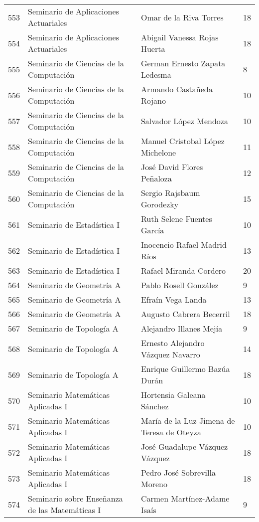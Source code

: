 \begin{table}[ht]
\begin{tabular}{rlll}
  553 & Seminario de Aplicaciones Actuariales & Omar de la Riva Torres & 18 \\ 
  554 & Seminario de Aplicaciones Actuariales & Abigail Vanessa Rojas Huerta & 18 \\ 
  555 & Seminario de Ciencias de la Computación & German Ernesto Zapata Ledesma & 8 \\ 
  556 & Seminario de Ciencias de la Computación & Armando Castañeda Rojano & 10 \\ 
  557 & Seminario de Ciencias de la Computación & Salvador López Mendoza & 10 \\ 
  558 & Seminario de Ciencias de la Computación & Manuel Cristobal López Michelone & 11 \\ 
  559 & Seminario de Ciencias de la Computación & José David Flores Peñaloza & 12 \\ 
  560 & Seminario de Ciencias de la Computación & Sergio Rajsbaum Gorodezky & 15 \\ 
  561 & Seminario de Estadística I & Ruth Selene Fuentes García & 10 \\ 
  562 & Seminario de Estadística I & Inocencio Rafael Madrid Ríos & 13 \\ 
  563 & Seminario de Estadística I & Rafael Miranda Cordero & 20 \\ 
  564 & Seminario de Geometría A & Pablo Rosell González & 9 \\ 
  565 & Seminario de Geometría A & Efraín Vega Landa & 13 \\ 
  566 & Seminario de Geometría A & Augusto Cabrera Becerril & 18 \\ 
  567 & Seminario de Topología A & Alejandro Illanes Mejía & 9 \\ 
  568 & Seminario de Topología A & Ernesto Alejandro Vázquez Navarro & 14 \\ 
  569 & Seminario de Topología A & Enrique Guillermo Bazúa Durán & 18 \\ 
  570 & Seminario Matemáticas Aplicadas I & Hortensia Galeana Sánchez & 10 \\ 
  571 & Seminario Matemáticas Aplicadas I & María de la Luz Jimena de Teresa de Oteyza & 10 \\ 
  572 & Seminario Matemáticas Aplicadas I & José Guadalupe Vázquez Vázquez & 18 \\ 
  573 & Seminario Matemáticas Aplicadas I & Pedro José Sobrevilla Moreno & 18 \\ 
  574 & Seminario sobre Enseñanza de las Matemáticas I & Carmen Martínez-Adame Isaís & 9 \\ 

\end{tabular}
\end{table}
